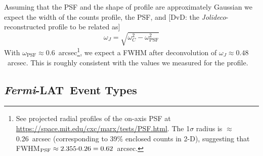 \documentclass[twocolumn]{aastex631}
\newcommand{\chandra}{\textit{Chandra}~}
\newcommand{\xmm}{\textit{XMM}~}
\newcommand{\fermi}{\textit{Fermi}-LAT~}
\newcommand{\jolideconospace}{\textit{Jolideco}}
\newcommand{\dvd}[1]{{\color{red} [DvD: #1]}}
\begin{document}
    Assuming that the PSF and the shape of %
    profile are approximately Gaussian we expect %
    the width of the counts profile, the PSF, and \dvd{the \jolideconospace-reconstructed profile to be related as} %
    \begin{equation}
        \omega_{J} = \sqrt{\omega_C^2 - \omega_{\mathrm{PSF}}^2}
    \end{equation}
    With $\omega_{\mathrm{PSF}}\approx0.6$~arcsec\footnote{See projected radial profiles of the on-axis PSF at \url{https://space.mit.edu/cxc/marx/tests/PSF.html}.  The 1$\sigma$ radius is $\approx$0.26~arcsec (corresponding to 39\% enclosed counts in 2-D), suggesting that FWHM$_{{\rm PSF}}\approx{2.355{\cdot}0.26=0.62}$~arcsec.}, we expect a FWHM after deconvolution of $\omega_J\approx0.48$~arcsec. This is roughly consistent with the values we measured for the profile.
    

        

    \subsection{\fermi Event Types}
    
\end{document}
